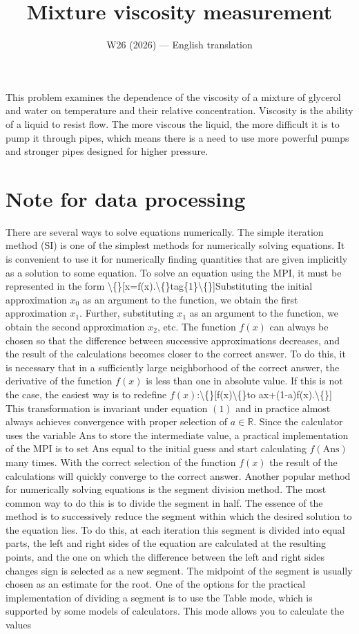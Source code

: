 \documentclass[11pt,a4paper]{article}
\title{\textbf{Mixture viscosity measurement}}
\author{\normalsize W26 (2026) --- English translation}
\date{}
\begin{document}
\maketitle

This problem examines the dependence of the viscosity of a mixture of glycerol and water on temperature and their relative concentration. Viscosity is the ability of a liquid to resist flow. The more viscous the liquid, the more difficult it is to pump it through pipes, which means there is a need to use more powerful pumps and stronger pipes designed for higher pressure.

\section*{Note for data processing}

There are several ways to solve equations numerically. The simple iteration method (SI) is one of the simplest methods for numerically solving equations. It is convenient to use it for numerically finding quantities that are given implicitly as a solution to some equation. To solve an equation using the MPI, it must be represented in the form \textbackslash\{\}[x=f(x).\textbackslash\{\}tag\{1\}\textbackslash\{\}]Substituting the initial approximation $x_0$ as an argument to the function, we obtain the first approximation $x_1$. Further, substituting $x_1$ as an argument to the function, we obtain the second approximation $x_2$, etc. The function $f(x)$ can always be chosen so that the difference between successive approximations decreases, and the result of the calculations becomes closer to the correct answer. To do this, it is necessary that in a sufficiently large neighborhood of the correct answer, the derivative of the function $f(x)$ is less than one in absolute value. If this is not the case, the easiest way is to redefine $f(x)$:\textbackslash\{\}[f(x)\textbackslash\{\}to ax+(1-a)f(x).\textbackslash\{\}] This transformation is invariant under equation $(1)$ and in practice almost always achieves convergence with proper selection of $a\in \mathbb R$. Since the calculator uses the variable $\mathrm{Ans}$ to store the intermediate value, a practical implementation of the MPI is to set $\mathrm{Ans}$ equal to the initial guess and start calculating $f(\mathrm{Ans})$ many times. With the correct selection of the function $f(x)$ the result of the calculations will quickly converge to the correct answer. Another popular method for numerically solving equations is the segment division method. The most common way to do this is to divide the segment in half. The essence of the method is to successively reduce the segment within which the desired solution to the equation lies. To do this, at each iteration this segment is divided into equal parts, the left and right sides of the equation are calculated at the resulting points, and the one on which the difference between the left and right sides changes sign is selected as a new segment. The midpoint of the segment is usually chosen as an estimate for the root. One of the options for the practical implementation of dividing a segment is to use the Table mode, which is supported by some models of calculators. This mode allows you to calculate the values 
\end{document}

